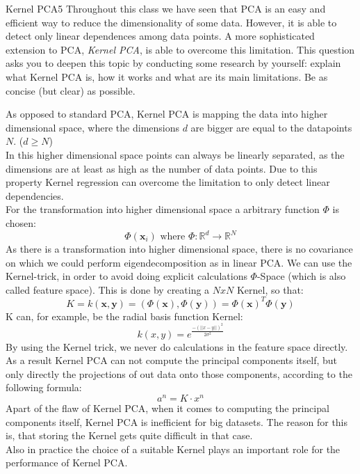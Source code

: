 \begin{questions}
\begin{question}[bonus]{Kernel PCA}{5}
Throughout this class we have seen that PCA is an easy and efficient way to reduce the dimensionality of some data. However, it is able to detect only linear dependences among data points. A more sophisticated extension to PCA, \emph{Kernel PCA}, is able to overcome this limitation. 
This question asks you to deepen this topic by conducting some research by yourself: explain what Kernel PCA is, how it works and what are its main limitations. Be as concise (but clear) as possible.

\begin{answer}
As opposed to standard PCA, Kernel PCA is mapping the data into higher dimensional space, where the dimensions $d$ are bigger are equal to the datapoints $N$.  ($d \geq N$) \\
In this higher dimensional space points can always be linearly separated, as the dimensions are at least as high as the number of data points. Due to this property Kernel regression can overcome the limitation to only detect linear dependencies.\\
For the transformation into higher dimensional space a arbitrary function $\Phi$ is chosen:
\begin{equation}
\Phi(\mathbf{x}_{i}) \text { where } \Phi : \mathbb{R}^{d} \rightarrow \mathbb{R}^{N}
\end{equation}
As there is a transformation into higher dimensional space, there is no covariance on which we could perform eigendecomposition as in linear PCA. We can use the Kernel-trick, in order to avoid doing explicit calculations $\Phi$-Space (which is also called feature space). This is done by creating a $NxN$ Kernel, so that:
\begin{equation}
K=k(\mathbf{x}, \mathbf{y})=(\Phi(\mathbf{x}), \Phi(\mathbf{y}))=\Phi(\mathbf{x})^{T} \Phi(\mathbf{y})
\end{equation}
K can, for example, be the radial basis function Kernel:
\begin{equation}
k (x,y) = e^{\frac{-{(\lvert\lvert x-y \rvert\rvert)}^2}{2\sigma^2}}
\end{equation}
By using the Kernel trick, we never do calculations in the feature space directly. As a result Kernel PCA can not compute the principal components itself, but only directly the projections of out data onto those components, according to the following formula:
\begin{equation}
a^n = K \cdot x^n
\end{equation}
Apart of the flaw of Kernel PCA, when it comes to computing the principal components itself, Kernel PCA is inefficient for big datasets. The reason for this is, that storing the Kernel gets quite difficult in that case.\\
Also in practice the choice of a suitable Kernel plays an important role for the performance of Kernel PCA.
\end{answer}
\end{question}

\end{questions}
